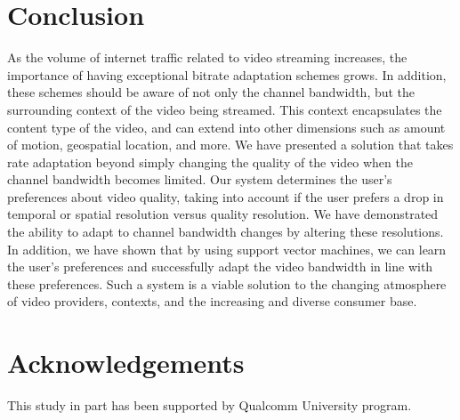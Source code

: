 \section{Conclusion}
\label{sec:Conclusion}
As the volume of internet traffic related to video streaming increases, the importance of having exceptional bitrate adaptation schemes grows. In addition, these schemes should be aware of not only the channel bandwidth, but the surrounding context of the video being streamed. This context encapsulates the content type of the video, and can extend into other dimensions such as amount of motion, geospatial location, and more. We have presented a solution that takes rate adaptation beyond simply changing the quality of the video when the channel bandwidth becomes limited. Our system determines the user’s preferences about video quality, taking into account if the user prefers a drop in temporal or spatial resolution versus quality resolution. We have demonstrated the ability to adapt to channel bandwidth changes by altering these resolutions. In addition, we have shown that by using support vector machines, we can learn the user’s preferences and successfully adapt the video bandwidth in line with these preferences. Such a system is a viable solution to the changing atmosphere of video providers, contexts, and the increasing and diverse consumer base.

\section*{Acknowledgements}
This study in part has been supported by Qualcomm University program. 





